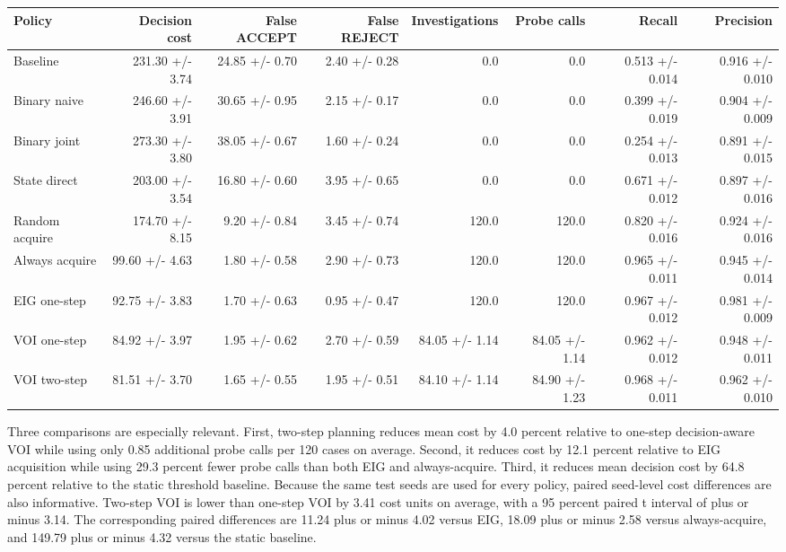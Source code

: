 \documentclass[
]{article}
\begin{document}
\begin{longtable}[]{@{}lrrrrrrr@{}}
\toprule\noalign{}
Policy & Decision cost & False ACCEPT & False REJECT & Investigations & Probe calls & Recall & Precision \\
\midrule\noalign{}
\endhead
\bottomrule\noalign{}
\endlastfoot
Baseline & 231.30 +/- 3.74 & 24.85 +/- 0.70 & 2.40 +/- 0.28 & 0.0 & 0.0 & 0.513 +/- 0.014 & 0.916 +/- 0.010 \\
Binary naive & 246.60 +/- 3.91 & 30.65 +/- 0.95 & 2.15 +/- 0.17 & 0.0 & 0.0 & 0.399 +/- 0.019 & 0.904 +/- 0.009 \\
Binary joint & 273.30 +/- 3.80 & 38.05 +/- 0.67 & 1.60 +/- 0.24 & 0.0 & 0.0 & 0.254 +/- 0.013 & 0.891 +/- 0.015 \\
State direct & 203.00 +/- 3.54 & 16.80 +/- 0.60 & 3.95 +/- 0.65 & 0.0 & 0.0 & 0.671 +/- 0.012 & 0.897 +/- 0.016 \\
Random acquire & 174.70 +/- 8.15 & 9.20 +/- 0.84 & 3.45 +/- 0.74 & 120.0 & 120.0 & 0.820 +/- 0.016 & 0.924 +/- 0.016 \\
Always acquire & 99.60 +/- 4.63 & 1.80 +/- 0.58 & 2.90 +/- 0.73 & 120.0 & 120.0 & 0.965 +/- 0.011 & 0.945 +/- 0.014 \\
EIG one-step & 92.75 +/- 3.83 & 1.70 +/- 0.63 & 0.95 +/- 0.47 & 120.0 & 120.0 & 0.967 +/- 0.012 & 0.981 +/- 0.009 \\
VOI one-step & 84.92 +/- 3.97 & 1.95 +/- 0.62 & 2.70 +/- 0.59 & 84.05 +/- 1.14 & 84.05 +/- 1.14 & 0.962 +/- 0.012 & 0.948 +/- 0.011 \\
VOI two-step & 81.51 +/- 3.70 & 1.65 +/- 0.55 & 1.95 +/- 0.51 & 84.10 +/- 1.14 & 84.90 +/- 1.23 & 0.968 +/- 0.011 & 0.962 +/- 0.010 \\
\end{longtable}

Three comparisons are especially relevant. First, two-step planning reduces mean cost by 4.0 percent relative to one-step decision-aware VOI while using only 0.85 additional probe calls per 120 cases on average. Second, it reduces cost by 12.1 percent relative to EIG acquisition while using 29.3 percent fewer probe calls than both EIG and always-acquire. Third, it reduces mean decision cost by 64.8 percent relative to the static threshold baseline. Because the same test seeds are used for every policy, paired seed-level cost differences are also informative. Two-step VOI is lower than one-step VOI by 3.41 cost units on average, with a 95 percent paired t interval of plus or minus 3.14. The corresponding paired differences are 11.24 plus or minus 4.02 versus EIG, 18.09 plus or minus 2.58 versus always-acquire, and 149.79 plus or minus 4.32 versus the static baseline.
\end{document}

